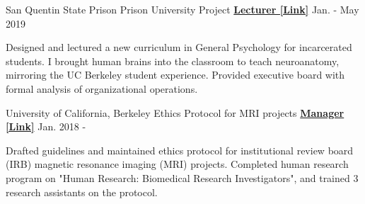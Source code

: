 \begin{cventries}
  \cventry
    {San Quentin State Prison} %
    {Prison University Project}
    {\href{https://www.neh.gov/about/awards/national-humanities-medals/prison-university-project}{\textbf{Lecturer [Link]}}} %
    {Jan. - May 2019} %
    {
      \begin{cvitems} %
        \item {Designed and lectured a new curriculum in General Psychology for incarcerated students. I brought human brains into the classroom to teach neuroanatomy, mirroring the UC Berkeley student experience. Provided executive board with formal analysis of organizational operations.}
      \end{cvitems}
    }
    
  \cventry 
    {University of California, Berkeley} %
    {Ethics Protocol for MRI projects}
    {\href{https://drive.google.com/file/d/1h66emU7-TRl-mSLZTEH01E3Qf5ZpEdbv/view?usp=sharing}{\textbf{Manager [Link]}}} %
    {Jan. 2018 - } %
    {
      \begin{cvitems} %
      	\item {Drafted guidelines and maintained ethics protocol for institutional review board (IRB) magnetic resonance imaging (MRI) projects. Completed human research program on "Human Research: Biomedical Research Investigators", and trained 3 research assistants on the protocol.}
      \end{cvitems}
    }

\end{cventries}


